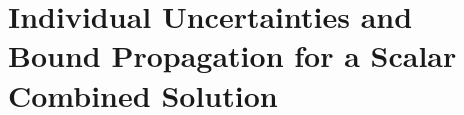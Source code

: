 \documentclass[graybox]{svmult}
\begin{document}

\section{Individual Uncertainties and Bound Propagation for a Scalar Combined Solution} \label{sec:comb_sol_approx}
\end{document}
